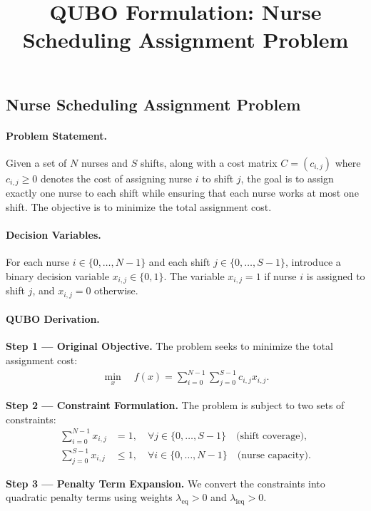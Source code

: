 \documentclass[12pt]{article}
\title{QUBO Formulation: Nurse Scheduling Assignment Problem}
\date{}
\begin{document}
\maketitle

\subsection*{Nurse Scheduling Assignment Problem}

\paragraph{Problem Statement.}
Given a set of $N$ nurses and $S$ shifts, along with a cost matrix $C = (c_{i,j})$ where $c_{i,j} \ge 0$ denotes the cost of assigning nurse $i$ to shift $j$, the goal is to assign exactly one nurse to each shift while ensuring that each nurse works at most one shift. The objective is to minimize the total assignment cost.

\paragraph{Decision Variables.}
For each nurse $i \in \{0, \dots, N-1\}$ and each shift $j \in \{0, \dots, S-1\}$, introduce a binary decision variable $x_{i,j} \in \{0, 1\}$. The variable $x_{i,j} = 1$ if nurse $i$ is assigned to shift $j$, and $x_{i,j} = 0$ otherwise.

\paragraph{QUBO Derivation.}
\textbf{Step 1 --- Original Objective.}
The problem seeks to minimize the total assignment cost:
\begin{align}
\min_{x} \quad f(x) = \sum_{i=0}^{N-1} \sum_{j=0}^{S-1} c_{i,j} x_{i,j}.
\end{align}

\textbf{Step 2 --- Constraint Formulation.}
The problem is subject to two sets of constraints:
\begin{align}
\sum_{i=0}^{N-1} x_{i,j} &= 1, \quad \forall j \in \{0, \dots, S-1\} \quad \text{(shift coverage)}, \\
\sum_{j=0}^{S-1} x_{i,j} &\le 1, \quad \forall i \in \{0, \dots, N-1\} \quad \text{(nurse capacity)}.
\end{align}

\textbf{Step 3 --- Penalty Term Expansion.}
We convert the constraints into quadratic penalty terms using weights $\lambda_{\text{eq}} > 0$ and $\lambda_{\text{leq}} > 0$.
\end{document}
